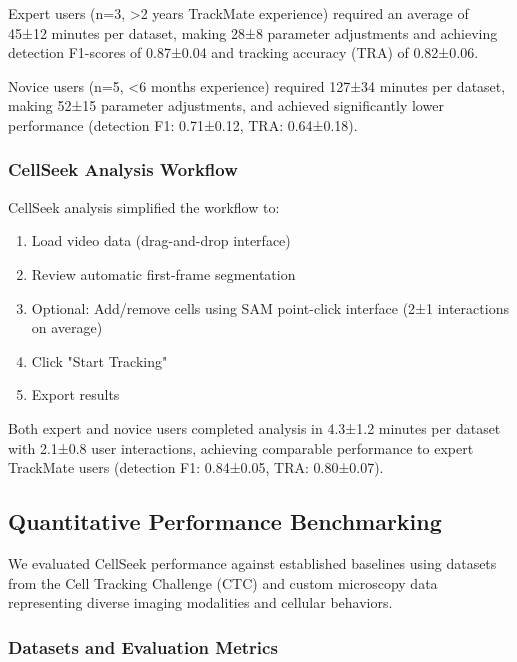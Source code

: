 \documentclass[12pt]{article}
\begin{document}
Expert users (n=3, >2 years TrackMate experience) required an average of 45±12 minutes per dataset, making 28±8 parameter adjustments and achieving detection F1-scores of 0.87±0.04 and tracking accuracy (TRA) of 0.82±0.06.

Novice users (n=5, <6 months experience) required 127±34 minutes per dataset, making 52±15 parameter adjustments, and achieved significantly lower performance (detection F1: 0.71±0.12, TRA: 0.64±0.18).

\subsubsection{CellSeek Analysis Workflow}

CellSeek analysis simplified the workflow to:
\begin{enumerate}
\item Load video data (drag-and-drop interface)
\item Review automatic first-frame segmentation
\item Optional: Add/remove cells using SAM point-click interface (2±1 interactions on average)
\item Click "Start Tracking" 
\item Export results
\end{enumerate}

Both expert and novice users completed analysis in 4.3±1.2 minutes per dataset with 2.1±0.8 user interactions, achieving comparable performance to expert TrackMate users (detection F1: 0.84±0.05, TRA: 0.80±0.07).

\subsection{Quantitative Performance Benchmarking}


We evaluated CellSeek performance against established baselines using datasets from the Cell Tracking Challenge (CTC) and custom microscopy data representing diverse imaging modalities and cellular behaviors.

\subsubsection{Datasets and Evaluation Metrics}
\end{document}
